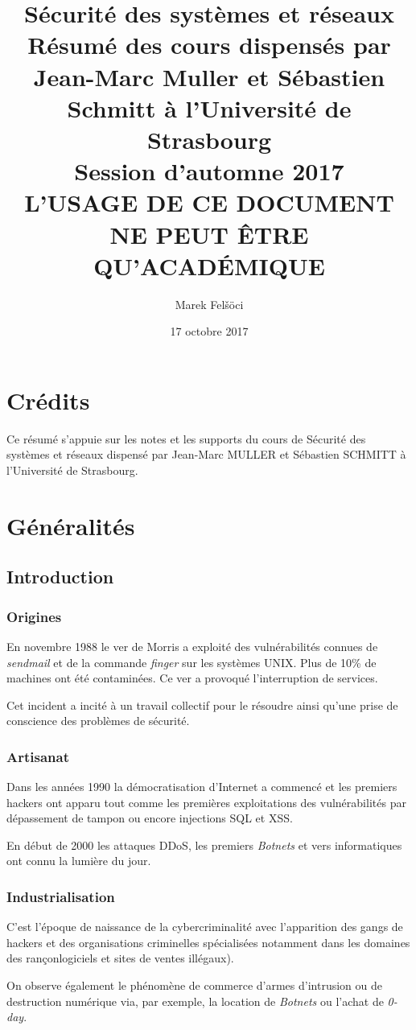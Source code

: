 \documentclass[12pt, a4paper]{article}
\title{
  \textbf{Sécurité des systèmes et réseaux} \\
  \Large Résumé des cours dispensés par Jean-Marc Muller et Sébastien Schmitt à
	l'Université de Strasbourg \\
  \large Session d'automne 2017 \\
  \huge L'USAGE DE CE DOCUMENT NE PEUT ÊTRE QU'ACADÉMIQUE
}
\author{Marek Felšöci}
\date{17 octobre 2017}
\begin{document}
	\maketitle
	\section*{Crédits}
  Ce résumé s'appuie sur les notes et les supports du cours de Sécurité des
	systèmes et réseaux dispensé par Jean-Marc MULLER et Sébastien SCHMITT à
	l'Université de	Strasbourg.
	\section{Généralités}
	\subsection{Introduction}
	\subsubsection{Origines}
	En novembre 1988 le ver de Morris a exploité des vulnérabilités connues de
	\textit{sendmail} et de la commande \textit{finger} sur les systèmes UNIX.
	Plus de 10\% de machines ont été contaminées. Ce ver a provoqué l'interruption
	 de services.
	\par
	Cet incident a incité à un travail collectif pour le résoudre ainsi qu'une
	prise de conscience des problèmes de sécurité.
	\subsubsection{Artisanat}
	Dans les années 1990 la démocratisation d'Internet a commencé et les premiers
	hackers ont apparu tout comme les premières exploitations des vulnérabilités
	par dépassement de tampon ou encore injections SQL et XSS.
	\par
	En début de 2000 les attaques DDoS, les premiers \textit{Botnets} et vers
	informatiques ont connu la lumière du jour.
	\subsubsection{Industrialisation}
	C'est l'époque de naissance de la cybercriminalité avec l'apparition des gangs
	 de hackers et des organisations criminelles spécialisées notamment dans les
	domaines des rançonlogiciels et sites de ventes illégaux).
	\par
	On observe également le phénomène de commerce d'armes d'intrusion ou de
	destruction numérique via, par exemple, la location de \textit{Botnets} ou
	l'achat de \textit{0-day}.
\end{document}
